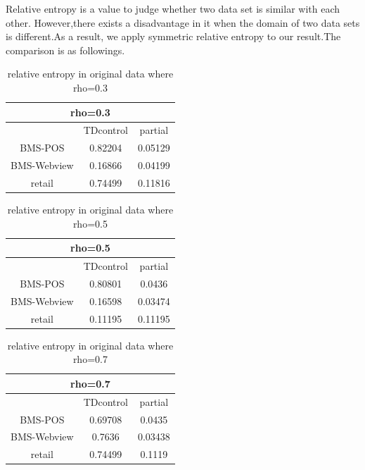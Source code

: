 \documentclass{article}
\begin{document}
Relative entropy is a value to judge whether two data set is similar with each other. However,there exists a disadvantage in it when the domain of two data sets is different.As a result, we apply symmetric relative entropy to our result.The comparison is as followings.

\begin{table}[htb]
\begin{tabular}{|c|c|c|}
  \hline
    \multicolumn{3}{|c|}{rho=0.3}\\
  \hline
   & TDcontrol & partial \\\hline
  BMS-POS & 0.82204 & 0.05129 \\\hline
  BMS-Webview & 0.16866 & 0.04199 \\\hline
  retail & 0.74499 & 0.11816 \\
  \hline
\end{tabular}
\caption{ relative entropy in original data where rho=0.3}
\end{table}

\begin{table}
\begin{tabular}{|c|c|c|}
  \hline
    \multicolumn{3}{|c|}{rho=0.5}\\\hline
   & TDcontrol & partial \\\hline
  BMS-POS & 0.80801 & 0.0436 \\\hline
  BMS-Webview &0.16598 & 0.03474 \\\hline
  retail & 0.11195& 0.11195 \\
  \hline
\end{tabular}
\caption{ relative entropy in original data where rho=0.5}
\end{table}



\begin{table}
\begin{tabular}{|c|c|c|}
  \hline
    \multicolumn{3}{|c|}{rho=0.7}\\
  \hline
   & TDcontrol & partial \\\hline
  BMS-POS &0.69708 & 0.0435 \\\hline
  BMS-Webview     &0.7636 & 0.03438 \\\hline
  retail    & 0.74499& 0.1119 \\
  \hline
\end{tabular}
\caption{ relative entropy in original data where rho=0.7}
\end{table}
\end{document}
